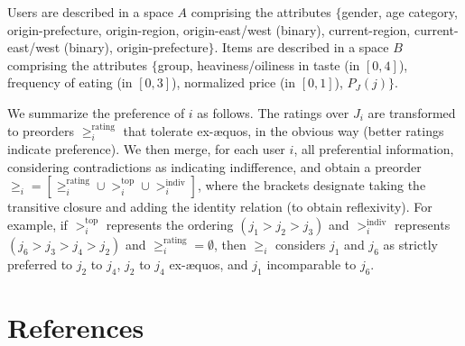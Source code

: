 \documentclass[version=last, pagesize, twoside=off, bibliography=totoc, DIV=calc, fontsize=14pt, a4paper, french, english]{scrartcl}
\begin{document}
Users are described in a space $A$ comprising the attributes $\{$gender, age category, origin-prefecture, origin-region, origin-east/west (binary), current-region, current-east/west (binary), origin-prefecture$\}$. Items are described in a space $B$ comprising the attributes $\{$group, heaviness/oiliness in taste (in $[0, 4]$), frequency of eating (in $[0, 3]$), normalized price (in $[0, 1]$), $P_J(j)$$\}$.

We summarize the preference of $i$ as follows. The ratings over $J_i$ are transformed to preorders $≥^\text{rating}_i$ that tolerate ex-æquos, in the obvious way (better ratings indicate preference). We then merge, for each user $i$, all preferential information, considering contradictions as indicating indifference, and obtain a preorder $≥_i = [≥^\text{rating}_i ∪ >^\text{top}_i ∪ >^\text{indiv}_i]$, where the brackets designate taking the transitive closure and adding the identity relation (to obtain reflexivity). For example, if $>^\text{top}_i$ represents the ordering $(j_1 > j_2 > j_3)$ and $>^\text{indiv}_i$ represents $(j_6 > j_3 > j_4 > j_2)$ and $≥^\text{rating}_i = \emptyset$, then $≥_i$ considers $j_1$ and $j_6$ as strictly preferred to $j_2$ to $j_4$, $j_2$ to $j_4$ ex-æquos, and $j_1$ incomparable to $j_6$.

\section{References}
%
\end{document}
